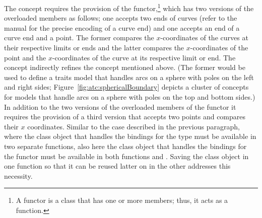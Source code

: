 The concept  requires the provision of the    functor,\footnote{A functor is a class that has one or more  members; thus, it acts as a function.} which has two versions of the overloaded members  as follows; one accepts two ends of curves (refer to the manual for the precise encoding of a curve end) and one accepts an end of a curve end and a point. The former compares the $x$-coordinates of the curves at their respective limits or ends and the latter compares the $x$-coordinates of the point and the $x$-coordinates of the curve at its respective limit or end.
%
The concept  indirectly refines the concept  mentioned above. (The former would be used to define a traits model that handles arcs on a sphere with poles on the left and right sides;  Figure~\ref{fig:atc:sphericalBoundary} depicts a cluster of concepts for models that handle arcs on a sphere with poles on the top and bottom sides.) In addition to the two versions of the overloaded members  of the functor   it requires the provision of a third version that accepts two points and compares their $x$ coordinates. Similar to the case described in the previous paragraph, where the class object that handles the bindings for the  type must be available in two separate functions, also here the class object that handles the bindings for the functor  must be available in both functions  and  . Saving the class object in one function so that it can be reused latter on in the other addresses this necessity.

